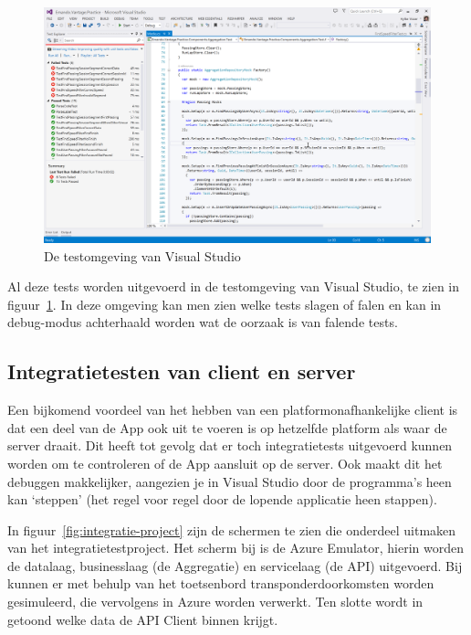 \begin{figure}
  \begin{center}
  \includegraphics[width=\textwidth]{style/images/screenshots/Testing}    
  \end{center}
  \caption{De testomgeving van Visual Studio}  
  \label{fig:visual-studio-testing}
\end{figure}

Al deze tests worden uitgevoerd in de testomgeving van Visual Studio, te zien in figuur~\ref{fig:visual-studio-testing}. In deze omgeving kan men zien welke tests slagen of falen en kan in debug-modus achterhaald worden wat de oorzaak is van falende tests. 

\subsection{Integratietesten van client en server}
Een bijkomend voordeel van het hebben van een platformonafhankelijke client is dat een deel van de App ook uit te voeren is op hetzelfde platform als waar de server draait. Dit heeft tot gevolg dat er toch integratietests uitgevoerd kunnen worden om te controleren of de App aansluit op de server. Ook maakt dit het debuggen makkelijker, aangezien je  in Visual Studio door de programma's heen kan `steppen' (het regel voor regel door de lopende applicatie heen stappen).

In figuur~\ref{fig:integratie-project} zijn de schermen te zien die onderdeel uitmaken van het integratietestproject. Het scherm bij  is de Azure Emulator, hierin worden de datalaag, businesslaag (de Aggregatie) en servicelaag (de API) uitgevoerd. Bij  kunnen er met behulp van het toetsenbord transponderdoorkomsten worden gesimuleerd, die vervolgens in Azure worden verwerkt. Ten slotte wordt in  getoond welke data de API Client binnen krijgt.

